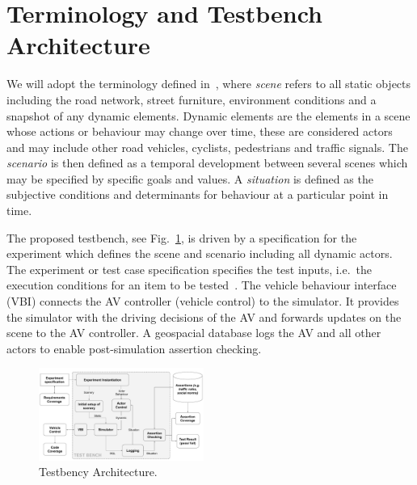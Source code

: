 \documentclass[letterpaper, 10 pt, journal, twoside]{IEEEtran}
\begin{document}
\section{Terminology and Testbench Architecture}\label{s:testbench}

We will adopt the terminology defined in~\cite{Ulbrich2015}, where \textit{scene} refers to all static objects including the road network, street furniture, environment conditions and a snapshot of any dynamic elements. Dynamic elements are the elements in a scene whose actions or behaviour may change over time, these are considered actors and may include other road vehicles, cyclists, pedestrians and traffic signals. 
%
The \textit{scenario} is then defined as a temporal development between several scenes which may be specified by specific goals and values.
%
A \textit{situation} is defined as the subjective conditions and determinants for behaviour at a particular point in time. 

The proposed testbench, see Fig.~\ref{f:testbench}, is driven by a specification for the experiment which defines the scene and scenario including all dynamic actors. 
%
The experiment or test case specification specifies the test inputs, i.e.\ the execution conditions for an item to be tested~\cite{StandardsBoard1990}.
%
The vehicle behaviour interface (VBI) connects the AV controller (vehicle control) to the simulator. It provides the simulator with the driving decisions of the AV and forwards updates on the scene to the AV controller. 
%
A geospacial database logs the AV and all other actors to enable post-simulation assertion checking. 


\begin{figure}[!t]
	\centering
\includegraphics[width=0.48\textwidth]{TestBenchMonotone.pdf}
	\caption{Testbency Architecture.}
	\label{f:testbench}
\end{figure}
\end{document}
